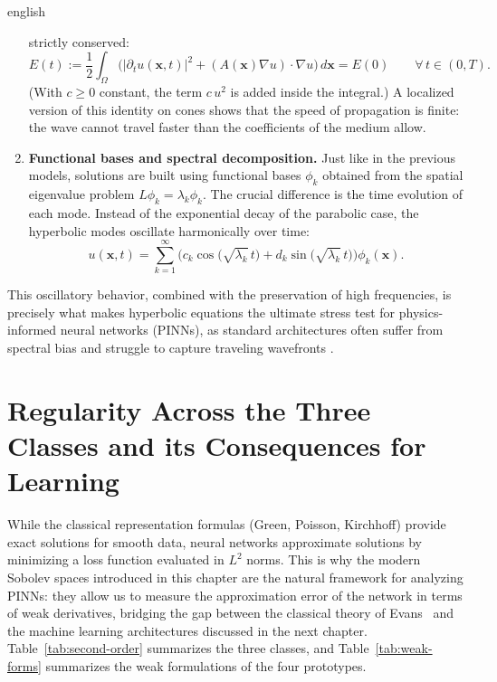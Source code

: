 \documentclass[12pt,letterpaper,twoside]{book}
\newcommand{\abs}[1]{\left\lvert #1 \right\rvert}
\begin{document}
\begin{hyphenrules}{english}
\begin{enumerate}
    strictly conserved:
    \begin{equation}
      E(t):=\frac12\int_\Omega\Big(\abs{\partial_t u(\mathbf{x},t)}^2+(A(\mathbf{x})\nabla u)\cdot\nabla u\Big)\,d\mathbf{x}=E(0)
      \qquad\forall\,t\in(0,T).
      \label{eq:energy-conservation}
    \end{equation}
    (With $c\ge0$ constant, the term $c\,u^2$ is added inside the integral.) A localized version of
    this identity on cones shows that the speed of propagation is finite: the wave cannot travel faster
    than the coefficients of the medium allow.
  \item \textbf{Functional bases and spectral decomposition.} Just like in the previous models,
    solutions are built using functional bases $\phi_k$ obtained from the spatial eigenvalue problem
    $L\phi_k=\lambda_k\phi_k$. The crucial difference is the time evolution of each mode. Instead of
    the exponential decay of the parabolic case, the hyperbolic modes oscillate harmonically over time:
    \begin{equation}
      u(\mathbf{x},t)=\sum_{k=1}^{\infty}\Big(c_k\cos\big(\sqrt{\lambda_k}\,t\big)+d_k\sin\big(\sqrt{\lambda_k}\,t\big)\Big)\phi_k(\mathbf{x}).
      \label{eq:hyperbolic-modes}
    \end{equation}
\end{enumerate}
This oscillatory behavior, combined with the preservation of high frequencies, is precisely what makes
hyperbolic equations the ultimate stress test for physics-informed neural networks (PINNs), as standard
architectures often suffer from spectral bias and struggle to capture traveling wavefronts
\cite{wang2021eigenvector,wang2022ntk}.

\section[Regularity and its Consequences for Learning]{Regularity Across the Three Classes and its Consequences for Learning}\label{sec:regularity-bridge}

While the classical representation formulas (Green, Poisson, Kirchhoff) provide exact solutions for
smooth data, neural networks approximate solutions by minimizing a loss function evaluated in $L^2$
norms. This is why the modern Sobolev spaces introduced in this chapter are the natural framework for
analyzing PINNs: they allow us to measure the approximation error of the network in terms of weak
derivatives, bridging the gap between the classical theory of Evans~\cite{evans2010} and the machine
learning architectures discussed in the next chapter. Table~\ref{tab:second-order} summarizes the three
classes, and Table~\ref{tab:weak-forms} summarizes the weak formulations of the four prototypes.


\end{hyphenrules}
\end{document}
